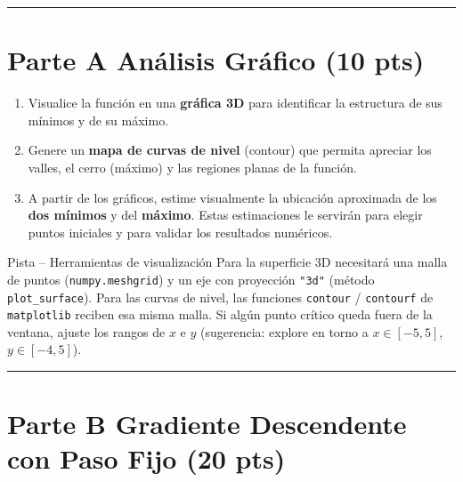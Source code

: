 \documentclass[12pt,a4paper]{article}
\begin{document}
\noindent\rule{\linewidth}{0.4pt}

\section*{Parte A \quad Análisis Gráfico \hfill\normalfont\normalsize(10 pts)}

\begin{enumerate}[label=\alph*), leftmargin=*, topsep=2pt]
    \item Visualice la función en una \textbf{gráfica 3D} para identificar la
          estructura de sus mínimos y de su máximo.
    \item Genere un \textbf{mapa de curvas de nivel} (contour) que permita
          apreciar los valles, el cerro (máximo) y las regiones planas de la
          función.
    \item A partir de los gráficos, estime visualmente la ubicación aproximada
          de los \textbf{dos mínimos} y del \textbf{máximo}. Estas estimaciones
          le servirán para elegir puntos iniciales y para validar los
          resultados numéricos.
\end{enumerate}

\begin{ayuda}{Pista -- Herramientas de visualización}
\vspace{2pt}
Para la superficie 3D necesitará una malla de puntos (\texttt{numpy.meshgrid})
y un eje con proyección \texttt{"3d"} (método \texttt{plot\_surface}). Para las
curvas de nivel, las funciones \texttt{contour} / \texttt{contourf} de
\texttt{matplotlib} reciben esa misma malla. Si algún punto crítico queda fuera
de la ventana, ajuste los rangos de $x$ e $y$ (sugerencia: explore en torno a
$x\in[-5,5]$, $y\in[-4,5]$).
\end{ayuda}

\noindent\rule{\linewidth}{0.4pt}

\section*{Parte B \quad Gradiente Descendente con Paso Fijo \hfill\normalfont\normalsize(20 pts)}
\end{document}
